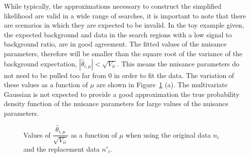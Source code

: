While typically, the approximations necessary to construct the simplified likelihood are valid in a wide range of searches, 
it is important to note that there are scenarios in which they are expected to be invalid. 
In the toy example given, the expected background and data in the search regions with a low signal to background ratio, are in good agreement. 
The fitted values of the nuisance parameters, therefore will be smaller than the square root of the variance of the 
background expectation,  $|\hat{\theta}_{i,\mu}| < \sqrt{V_{ii}}$. This means the nuisance parameters do not need to be pulled too far from 0 in order to  
fit the data. The variation of these values as a function of $\mu$ are shown in Figure~\ref{fig:nuisancevariation} (a). 
The multivariate Gaussian is not expected to provide a good approximation the true probability density function of the nuisance parameters for 
large values of the nuisance parameters.

\begin{figure}[hbt]
  \begin{center} 
   \caption{Values of $\dfrac{\hat{\theta}_{i,\mu}}{\sqrt{V_{ii}}}$ as a function of $\mu$ when using the original data $n_{i}$ and the replacement data $n'_{i}$.}
   \label{fig:nuisancevariation} 
  \end{center}
\end{figure}


